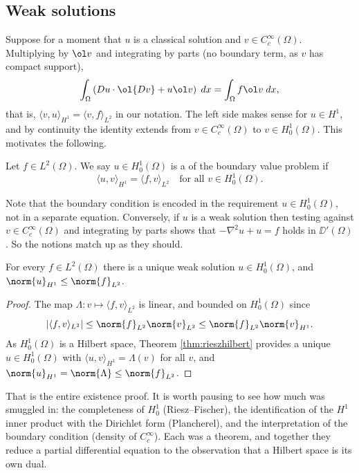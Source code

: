 \documentclass[a4paper]{scrartcl}
\newcommand{\ip}[2]{\langle #1, #2 \rangle}
\begin{document}
\subsection{Weak solutions}

Suppose for a moment that $u$ is a classical solution and $v \in C_c^\infty(\Omega)$. Multiplying by $\ol v$ and integrating by parts (no boundary term, as $v$ has compact support),
$$\int_\Omega\left( Du\cdot\ol{Dv}+u\ol v\right)\dd x = \int_\Omega f\ol v\dd x,$$
that is, $\ip{v}{u}_{H^1}=\ip{v}{f}_{L^2}$ in our notation. The left side makes sense for $u \in H^1$, and by continuity the identity extends from $v \in C_c^\infty(\Omega)$ to $v \in H_0^1(\Omega)$. This motivates the following.

\begin{definition}
	Let $f \in L^2(\Omega)$. We say $u \in H_0^1(\Omega)$ is a  of the boundary value problem if
	$$\ip{u}{v}_{H^1}=\ip{f}{v}_{L^2} \quad \text{for all } v \in H_0^1(\Omega).$$
\end{definition}

Note that the boundary condition is encoded in the requirement $u \in H_0^1(\Omega)$, not in a separate equation. Conversely, if $u$ is a weak solution then testing against $v \in C_c^\infty(\Omega)$ and integrating by parts shows that $-\nabla^2u+u=f$ holds in $\DD'(\Omega)$. So the notions match up as they should.

\begin{lemma}\label{lem:dirichletexist}
	For every $f \in L^2(\Omega)$ there is a unique weak solution $u \in H_0^1(\Omega)$, and $\norm{u}_{H^1}\le\norm{f}_{L^2}$.
\end{lemma}

\begin{proof}
	The map $\Lambda : v \mapsto \ip{f}{v}_{L^2}$ is linear, and bounded on $H_0^1(\Omega)$ since
	$$|\ip{f}{v}_{L^2}|\le\norm{f}_{L^2}\norm{v}_{L^2}\le\norm{f}_{L^2}\norm{v}_{H^1}.$$
	As $H_0^1(\Omega)$ is a Hilbert space, Theorem \ref{thm:rieszhilbert} provides a unique $u \in H_0^1(\Omega)$ with $\ip{u}{v}_{H^1}=\Lambda(v)$ for all $v$, and $\norm{u}_{H^1}=\norm{\Lambda}\le\norm{f}_{L^2}$.
\end{proof}

That is the entire existence proof. It is worth pausing to see how much was smuggled in: the completeness of $H_0^1$ (Riesz--Fischer), the identification of the $H^1$ inner product with the Dirichlet form (Plancherel), and the interpretation of the boundary condition (density of $C_c^\infty$). Each was a theorem, and together they reduce a partial differential equation to the observation that a Hilbert space is its own dual.
\end{document}
